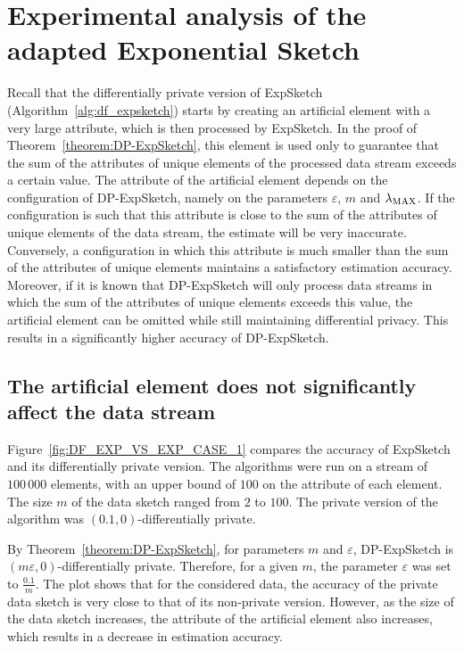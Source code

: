 \chapter{Experimental analysis of the adapted Exponential Sketch}
\label{chap:experiments}

Recall that the differentially private version of ExpSketch (Algorithm~\ref{alg:df_expsketch}) starts by creating an artificial element with a very large attribute, which is then processed by ExpSketch. In the proof of Theorem~\ref{theorem:DP-ExpSketch}, this element is used only to guarantee that the sum of the attributes of unique elements of the processed data stream exceeds a certain value. The attribute of the artificial element depends on the configuration of DP-ExpSketch, namely on the parameters $\varepsilon$, $m$ and $\lambda_{\mathrm{MAX}}$. If the configuration is such that this attribute is close to the sum of the attributes of unique elements of the data stream, the estimate will be very inaccurate. Conversely, a configuration in which this attribute is much smaller than the sum of the attributes of unique elements maintains a satisfactory estimation accuracy. Moreover, if it is known that DP-ExpSketch will only process data streams in which the sum of the attributes of unique elements exceeds this value, the artificial element can be omitted while still maintaining differential privacy. This results in a significantly higher accuracy of DP-ExpSketch.

\section{The artificial element does not significantly affect the data stream}

Figure~\ref{fig:DF_EXP_VS_EXP_CASE_1} compares the accuracy of ExpSketch and its differentially private version. The algorithms were run on a stream of $100\,000$ elements, with an upper bound of $100$ on the attribute of each element. The size $m$ of the data sketch ranged from $2$ to $100$. The private version of the algorithm was $(0.1, 0)$-differentially private.

By Theorem~\ref{theorem:DP-ExpSketch}, for parameters $m$ and $\varepsilon$, DP-ExpSketch is $(m\varepsilon, 0)$-differentially private. Therefore, for a given $m$, the parameter $\varepsilon$ was set to $\frac{0.1}{m}$. The plot shows that for the considered data, the accuracy of the private data sketch is very close to that of its non-private version. However, as the size of the data sketch increases, the attribute of the artificial element also increases, which results in a decrease in estimation accuracy.

